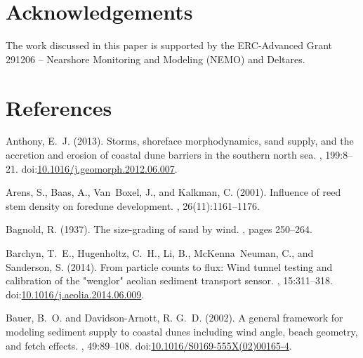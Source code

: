 \documentclass[preprint,12pt,authoryear,a4paper]{elsarticle}
\begin{document}
\newpage



\section*{Acknowledgements}
The work discussed in this paper is supported by the ERC-Advanced
Grant 291206 -- Nearshore Monitoring and Modeling (NEMO) and Deltares.

\section*{References}
\begin{thebibliography}{}

Anthony, E.~J. (2013).
\newblock Storms, shoreface morphodynamics, sand supply, and the accretion and
  erosion of coastal dune barriers in the southern north sea.
, 199:8--21.
\newblock
  doi:\href{http://dx.doi.org/10.1016/j.geomorph.2012.06.007}{10.1016/j.geomorph.2012.06.007}.

Arens, S., Baas, A., Van~Boxel, J., and Kalkman, C. (2001).
\newblock Influence of reed stem density on foredune development.
, 26(11):1161--1176.

Bagnold, R. (1937).
\newblock The size-grading of sand by wind.
, pages 250--264.

Barchyn, T.~E., Hugenholtz, C.~H., Li, B., McKenna~Neuman, C., and Sanderson,
  S. (2014).
\newblock From particle counts to flux: Wind tunnel testing and calibration of
  the "wenglor" aeolian sediment transport sensor.
, 15:311--318.
\newblock
  doi:\href{http://dx.doi.org/10.1016/j.aeolia.2014.06.009}{10.1016/j.aeolia.2014.06.009}.

Bauer, B.~O. and Davidson-Arnott, R. G.~D. (2002).
\newblock A general framework for modeling sediment supply to coastal dunes
  including wind angle, beach geometry, and fetch effects.
, 49:89--108.
\newblock
  doi:\href{http://dx.doi.org/10.1016/S0169-555X(02)00165-4}{10.1016/S0169-555X(02)00165-4}.


\end{thebibliography}
\end{document}
